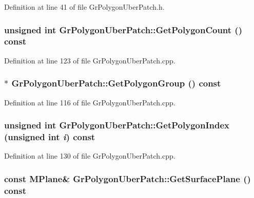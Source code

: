 Definition at line 41 of file GrPolygonUberPatch.h.\hypertarget{class_gr_polygon_uber_patch_a47f629d10e1fe72be7ba2407626feca}{
\subsubsection[{GetPolygonCount}]{\setlength{\rightskip}{0pt plus 5cm}unsigned int GrPolygonUberPatch::GetPolygonCount () const}}
\label{class_gr_polygon_uber_patch_a47f629d10e1fe72be7ba2407626feca}




Definition at line 123 of file GrPolygonUberPatch.cpp.\hypertarget{class_gr_polygon_uber_patch_1878a2441e199c1eeaa18a552c38311a}{
\subsubsection[{GetPolygonGroup}]{ $\ast$ GrPolygonUberPatch::GetPolygonGroup () const}}
\label{class_gr_polygon_uber_patch_1878a2441e199c1eeaa18a552c38311a}




Definition at line 116 of file GrPolygonUberPatch.cpp.\hypertarget{class_gr_polygon_uber_patch_51940d367acf3e294341efc596f518cf}{
\subsubsection[{GetPolygonIndex}]{\setlength{\rightskip}{0pt plus 5cm}unsigned int GrPolygonUberPatch::GetPolygonIndex (unsigned int {\em i}) const}}
\label{class_gr_polygon_uber_patch_51940d367acf3e294341efc596f518cf}




Definition at line 130 of file GrPolygonUberPatch.cpp.\hypertarget{class_gr_polygon_uber_patch_19e95a74d689a75115f1fc8b46cd43d4}{
\subsubsection[{GetSurfacePlane}]{\setlength{\rightskip}{0pt plus 5cm}const {\bf MPlane}\& GrPolygonUberPatch::GetSurfacePlane () const}}
\label{class_gr_polygon_uber_patch_19e95a74d689a75115f1fc8b46cd43d4}




